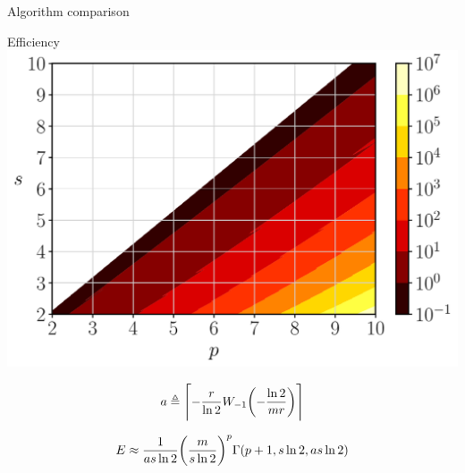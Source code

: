 \begin{frame}[allowframebreaks]{Algorithm comparison}
\begin{multicols}{2}
    \columnbreak

    \begin{center}
      Efficiency \\
      \includegraphics[width=.40\paperwidth]{Figures/chapter05/efficiency}
    \end{center}

  \end{multicols}
  \vspace{-3em}
  \begin{multicols}{2}

    \begin{gather*}
      a \defeq \ceil*{- \frac{r}{\ln{2}} W_{-1}\qty(-\frac{\ln{2}}{mr})}
    \end{gather*}

    \columnbreak

    \begin{gather*}
      E \approx \frac{1}{as\ln{2}} \qty(\frac{m}{s\ln{2}})^p
        \Gamma \qty(p+1, s\ln{2}, as\ln{2}) \label{eq:QSR-efficiency}
    \end{gather*}

  \end{multicols}

\end{frame}


